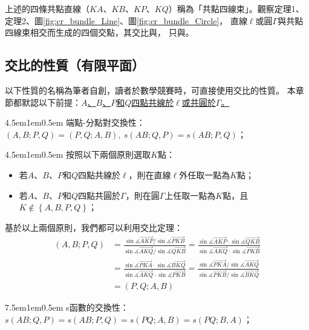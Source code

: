 \documentclass[12pt]{article}
\begin{document}
上述的四條共點直線（$KA$、$KB$、$KP$、$KQ$）稱為「共點四線束」。觀察定理1、定理2、圖\ref{fig:cr_bundle_Line}、圖\ref{fig:cr_bundle_Circle}，
直線$\ell$或圓$\Gamma$與共點四線束相交而生成的四個交點，其交比與，
只與。
\subsection{交比的性質（有限平面）}
以下性質的名稱為筆者自創，讀者於數學競賽時，可直接使用交比的性質。
本章節都默認以下前提：\underline{$A$、$B$、$P$和$Q$四點共線於$\ell$或共圓於$\Gamma$。}
\begin{mybox}[性質1]{4.5em}{1em}{0.5em}
    端點-分點對交換性：$\left(A,B;P,Q\right)=\left(P,Q;A,B\right),\ s\left(AB;Q,P\right)=s\left(AB;P,Q\right)$；
\end{mybox}
\begin{mybox}{4.5em}{1em}{0.5em}
    按照以下兩個原則選取$K$點：
    \begin{itemize}
        \item 若$A$、$B$、$P$和$Q$四點共線於$\ell$，則在直線$\ell$外任取一點為$K$點；
        \item 若$A$、$B$、$P$和$Q$四點共圓於$\Gamma$，則在圓$\Gamma$上任取一點為$K$點，且$K\notin\left\{A,B,P,Q\right\}$；
    \end{itemize}
    基於以上兩個原則，我們都可以利用交比定理：
    \begin{align*}
        \left(A,B;P,Q\right)&=\frac{\sin{\measuredangle{\overrightarrow{AKP}}}/\sin{\measuredangle{\overrightarrow{PKB}}}}{\sin{\measuredangle{\overrightarrow{AKQ}}}/\sin{\measuredangle{\overrightarrow{QKB}}}}=\frac{\sin{\measuredangle{\overrightarrow{AKP}}}\cdot\sin{\measuredangle{\overrightarrow{QKB}}}}{\sin{\measuredangle{\overrightarrow{AKQ}}}\cdot\sin{\measuredangle{\overrightarrow{PKB}}}}\\
        &=\frac{\sin{\measuredangle{\overrightarrow{PKA}}}\cdot\sin{\measuredangle{\overrightarrow{BKQ}}}}{\sin{\measuredangle{\overrightarrow{AKQ}}}\cdot\sin{\measuredangle{\overrightarrow{PKB}}}}=\frac{\sin{\measuredangle{\overrightarrow{PKA}}}/\sin{\measuredangle{\overrightarrow{AKQ}}}}{\sin{\measuredangle{\overrightarrow{PKB}}}/\sin{\measuredangle{\overrightarrow{BKQ}}}}\\
        &=\left(P,Q;A,B\right)
    \end{align*}
\end{mybox}
\begin{mybox}[性質1的推論]{7.5em}{1em}{0.5em}
    s函數的交換性：$s\left(AB;Q,P\right)=s\left(AB;P,Q\right)=s\left(PQ;A,B\right)=s\left(PQ;B,A\right)$；
\end{mybox}
\end{document}
